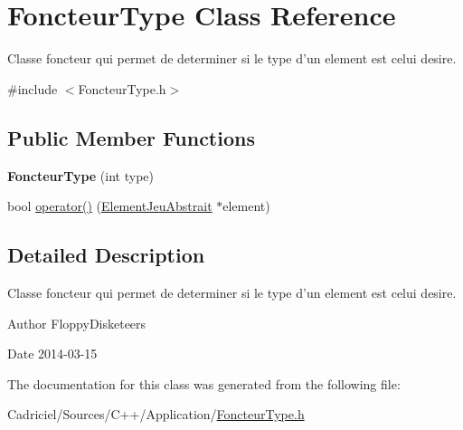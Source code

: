 \hypertarget{class_foncteur_type}{\section{Foncteur\-Type Class Reference}
\label{class_foncteur_type}
}


Classe foncteur qui permet de determiner si le type d'un element est celui desire.  




{\ttfamily \#include $<$Foncteur\-Type.\-h$>$}

\subsection*{Public Member Functions}
\begin{DoxyCompactItemize}
\item 
\hypertarget{group__inf2990_gafcde197bef3ec73b838a97b787605d46}{{\bfseries Foncteur\-Type} (int type)}\label{group__inf2990_gafcde197bef3ec73b838a97b787605d46}

\item 
bool \hyperlink{group__inf2990_ga133b99829c940832643aae8fc4b0dab7}{operator()} (\hyperlink{class_element_jeu_abstrait}{Element\-Jeu\-Abstrait} $\ast$element)
\end{DoxyCompactItemize}


\subsection{Detailed Description}
Classe foncteur qui permet de determiner si le type d'un element est celui desire. 

\begin{DoxyAuthor}{Author}
Floppy\-Disketeers 
\end{DoxyAuthor}
\begin{DoxyDate}{Date}
2014-\/03-\/15 
\end{DoxyDate}


The documentation for this class was generated from the following file\-:\begin{DoxyCompactItemize}
\item 
Cadriciel/\-Sources/\-C++/\-Application/\hyperlink{_foncteur_type_8h}{Foncteur\-Type.\-h}\end{DoxyCompactItemize}
